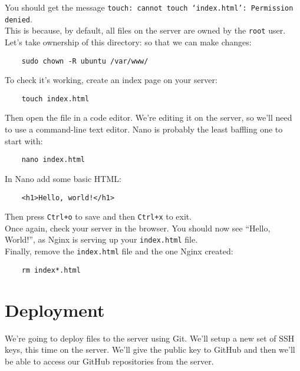 You should get the message \texttt{touch: cannot touch `index.html': Permission denied}.
\\

This is because, by default, all files on the server are owned by the \texttt{root} user.
\\

Let's take ownership of this directory: so that we can make changes:

\begin{verbatim}
    sudo chown -R ubuntu /var/www/
\end{verbatim}

To check it's working, create an index page on your server:

\begin{verbatim}
    touch index.html
\end{verbatim}

Then open the file in a code editor. We're editing it on the server, so we'll need to use a command-line text editor. Nano is probably the least baffling one to start with:

\begin{verbatim}
    nano index.html
\end{verbatim}

In Nano add some basic HTML:

\begin{verbatim}
    <h1>Hello, world!</h1>
\end{verbatim}

Then press \texttt{Ctrl+o} to save and then \texttt{Ctrl+x} to exit.
\\

Once again, check your server in the browser. You should now see ``Hello, World!'', as Nginx is serving up your \texttt{index.html} file.
\\

Finally, remove the \texttt{index.html} file and the one Nginx created:

\begin{verbatim}
    rm index*.html
\end{verbatim}


\section{Deployment}

We're going to deploy files to the server using Git. We'll setup a new set of SSH keys, this time on the server. We'll give the public key to GitHub and then we'll be able to access our GitHub repositories from the server.


